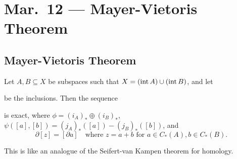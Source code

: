 \chapter{Mar.~12 --- Mayer-Vietoris Theorem}

\section{Mayer-Vietoris Theorem}

\begin{theorem}\label{thm:mayer-vietoris}
  Let $A, B \subseteq X$ be subspaces such that
  $X = (\operatorname{int} A) \cup (\operatorname{int} B)$, and let
  \begin{center}
  \end{center}
  be the inclusions. Then the sequence
  \begin{center}
  \end{center}
  is exact, where $\phi = (i_A)_* \oplus (i_B)_*$,
  $\psi([a], [b]) = (j_A)_*([a]) - (j_B)_*([b])$, and
  \[
    \partial [z] = [\partial a]
    \quad \text{where } z = a + b \text{ for } a \in C_*(A), b \in C_*(B).
  \]
\end{theorem}

\begin{remark}
  This is like an analogue of the Seifert-van Kampen
  theorem for homology.
\end{remark}

